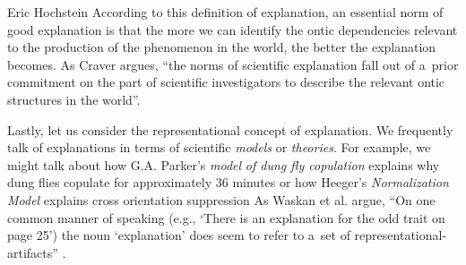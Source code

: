 \begin{artengenv}{Eric Hochstein}
According to this definition of explanation, an essential norm of good explanation is that the more we can identify the ontic dependencies relevant to the production of the phenomenon in the world, the better the explanation becomes. As Craver
\parencite*[][p.41]{kaiser_ontic_2014} %
 argues, ``the norms of scientific explanation fall out of a~prior commitment on the part of scientific investigators to describe the relevant ontic structures in the world''.

Lastly, let us consider the representational concept of explanation. We frequently talk of explanations in terms of scientific \textit{models} or \textit{theories}. For example, we might talk about how G.A. Parker's
\parencite*[][]{krebs_searching_1978} %
 \textit{model} \textit{of dung fly copulation} explains why dung flies copulate for approximately 36 minutes 
 or how Heeger's 
\parencite*[][]{heeger_normalization_1992} %
 \textit{Normalization Model} explains cross orientation suppression 
 As Waskan et al. 
\parencite*[][p.3090]{izadi_building_2014} %
 argue, ``On one common manner of speaking (e.g., ‘There is an explanation for the odd trait on page 25') the noun ‘explanation' does seem to refer to a~set of representational-artifacts'' .


\end{artengenv}

